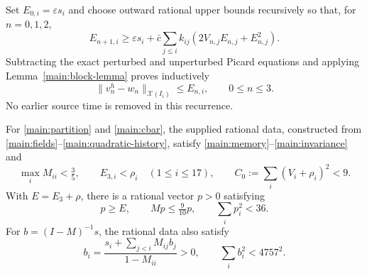 Set $E_{0,i}=\varepsilon s_i$ and choose outward rational upper bounds
recursively so that, for $n=0,1,2$,
\begin{equation}
 E_{n+1,i}\ge\varepsilon s_i+
 \bar c\sum_{j\le i}k_{ij}(2V_{n,j}E_{n,j}+E_{n,j}^2).
 \label{main:prefix}
\end{equation}
Subtracting the exact perturbed and unperturbed Picard equations and applying
Lemma~\ref{main:block-lemma} proves inductively
\begin{equation}
 \|v_n^h-w_n\|_{\mathcal X(I_i)}\le E_{n,i},\qquad 0\le n\le3.
 \label{main:prefix-error}
\end{equation}
No earlier source time is removed in this recurrence.

\begin{proposition}
\label{main:finite-certificate}
For \eqref{main:partition} and \eqref{main:cbar}, the supplied rational
data, constructed from \eqref{main:fields}--\eqref{main:quadratic-history},
satisfy \eqref{main:memory}--\eqref{main:invariance} and
\begin{equation}
 \max_i M_{ii}<\tfrac35,\qquad
 E_{3,i}<\rho_i\quad(1\le i\le17),\qquad
 C_0:=\sum_i(V_i+\rho_i)^2<9.\label{main:accepted}
\end{equation}
With $E=E_3+\rho$, there is a rational vector $p>0$ satisfying
\begin{equation}
 p\ge E,\qquad Mp\le\tfrac9{10}p,\qquad \sum_i p_i^2<36.
 \label{main:rate-check}
\end{equation}
For $b=(I-M)^{-1}s$, the rational data also satisfy
\begin{equation}
 b_i=\frac{s_i+\sum_{j<i}M_{ij}b_j}{1-M_{ii}}>0,
 \qquad \sum_i b_i^2<4757^2.\label{main:stability-check}
\end{equation}
\end{proposition}

